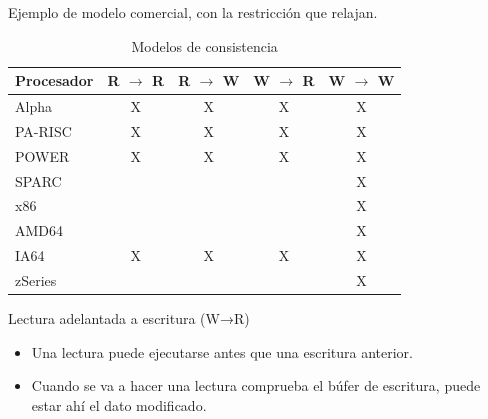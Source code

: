 \documentclass[12pt, twoside, openright]{report} %
\begin{document}
    Ejemplo de modelo comercial, con la restricción que relajan.
\begin{table}[H]
\centering
\begin{tabular}{l|c|c|c|c}
\textbf{Procesador} & \multicolumn{1}{l|}{R $\rightarrow$ R} & \multicolumn{1}{l|}{R $\rightarrow$ W} & \multicolumn{1}{l|}{W $\rightarrow$ R} & \multicolumn{1}{l}{W $\rightarrow$ W} \\ \hline
Alpha               & X                          & X                          & X                          & X                          \\ \hline
PA-RISC             & X                          & X                          & X                          & X                          \\ \hline
POWER               & X                          & X                          & X                          & X                          \\ \hline
SPARC               &                            &                            &                            & X                          \\ \hline
x86                 &                            &                            &                            & X                          \\ \hline
AMD64               &                            &                            &                            & X                          \\ \hline
IA64                & X                          & X                          & X                          & X                          \\ \hline
zSeries             &                            &                            &                            & X                          \\ \hline
\end{tabular}
\caption{Modelos de consistencia}
\end{table}
\pagebreak
    Lectura adelantada a escritura (W→R)

    \begin{itemize}
    
    \item
      Una lectura puede ejecutarse antes que una escritura anterior.
    \item
      Cuando se va a hacer una lectura comprueba el búfer de
      escritura, puede estar ahí el dato modificado.
    \end{itemize}
\end{document}

